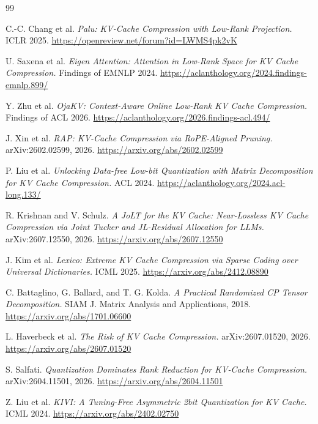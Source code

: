 \documentclass[11pt]{article}
\begin{document}
\begin{thebibliography}{99}\small

 C.-C. Chang et al. \emph{Palu: KV-Cache Compression with Low-Rank Projection.}
ICLR 2025. \url{https://openreview.net/forum?id=LWMS4pk2vK}

 U. Saxena et al. \emph{Eigen Attention: Attention in Low-Rank Space for KV Cache
Compression.} Findings of EMNLP 2024. \url{https://aclanthology.org/2024.findings-emnlp.899/}

 Y. Zhu et al. \emph{OjaKV: Context-Aware Online Low-Rank KV Cache Compression.}
Findings of ACL 2026. \url{https://aclanthology.org/2026.findings-acl.494/}

 J. Xin et al. \emph{RAP: KV-Cache Compression via RoPE-Aligned Pruning.}
arXiv:2602.02599, 2026. \url{https://arxiv.org/abs/2602.02599}

 P. Liu et al. \emph{Unlocking Data-free Low-bit Quantization with Matrix
Decomposition for KV Cache Compression.} ACL 2024. \url{https://aclanthology.org/2024.acl-long.133/}

 R. Krishnan and V. Schulz. \emph{A JoLT for the KV Cache: Near-Lossless KV Cache
Compression via Joint Tucker and JL-Residual Allocation for LLMs.} arXiv:2607.12550, 2026.
\url{https://arxiv.org/abs/2607.12550}

 J. Kim et al. \emph{Lexico: Extreme KV Cache Compression via Sparse Coding over
Universal Dictionaries.} ICML 2025. \url{https://arxiv.org/abs/2412.08890}

 C. Battaglino, G. Ballard, and T. G. Kolda. \emph{A Practical Randomized CP
Tensor Decomposition.} SIAM J. Matrix Analysis and Applications, 2018.
\url{https://arxiv.org/abs/1701.06600}

 L. Haverbeck et al. \emph{The Risk of KV Cache Compression.}
arXiv:2607.01520, 2026. \url{https://arxiv.org/abs/2607.01520}

 S. Salfati. \emph{Quantization Dominates Rank Reduction for KV-Cache
Compression.} arXiv:2604.11501, 2026. \url{https://arxiv.org/abs/2604.11501}

 Z. Liu et al. \emph{KIVI: A Tuning-Free Asymmetric 2bit Quantization for KV Cache.}
ICML 2024. \url{https://arxiv.org/abs/2402.02750}

\end{thebibliography}
\end{document}

